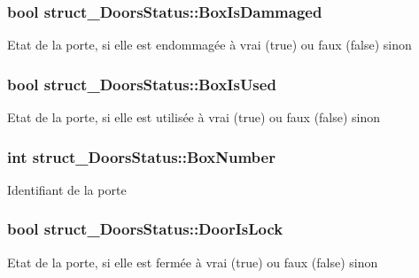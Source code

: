 \subsubsection[{Box\+Is\+Dammaged}]{\setlength{\rightskip}{0pt plus 5cm}bool struct\+\_\+\+Doors\+Status\+::\+Box\+Is\+Dammaged}\label{structstruct___doors_status_a2663f0fa457393e07c10ba1c9843d0ee}
Etat de la porte, si elle est endommagée à vrai (true) ou faux (false) sinon \hypertarget{structstruct___doors_status_a056929554c348f990417d17b1b66bd8d}{}
\subsubsection[{Box\+Is\+Used}]{\setlength{\rightskip}{0pt plus 5cm}bool struct\+\_\+\+Doors\+Status\+::\+Box\+Is\+Used}\label{structstruct___doors_status_a056929554c348f990417d17b1b66bd8d}
Etat de la porte, si elle est utilisée à vrai (true) ou faux (false) sinon \hypertarget{structstruct___doors_status_a139f38ebf1300f853d902b22520eda71}{}
\subsubsection[{Box\+Number}]{\setlength{\rightskip}{0pt plus 5cm}int struct\+\_\+\+Doors\+Status\+::\+Box\+Number}\label{structstruct___doors_status_a139f38ebf1300f853d902b22520eda71}
Identifiant de la porte \hypertarget{structstruct___doors_status_a878ee17f7494eb2ada44dd8fc126f271}{}
\subsubsection[{Door\+Is\+Lock}]{\setlength{\rightskip}{0pt plus 5cm}bool struct\+\_\+\+Doors\+Status\+::\+Door\+Is\+Lock}\label{structstruct___doors_status_a878ee17f7494eb2ada44dd8fc126f271}
Etat de la porte, si elle est fermée à vrai (true) ou faux (false) sinon \hypertarget{structstruct___doors_status_a6c7607cfa6b784ec4558eff3cb48aeaa}{}
